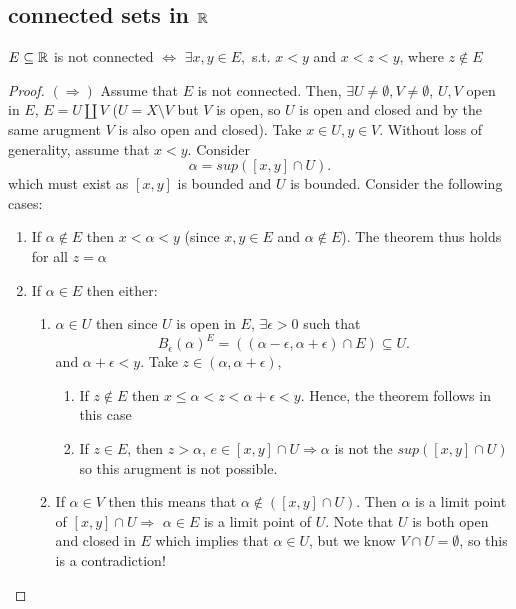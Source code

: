 \documentclass[a4paper]{article}
\begin{document}
\subsection{connected sets in $\mathbb{R}$}
\begin{theorem}
  $E \subseteq \mathbb{R}$ is not connected $\iff$ $\exists x,y \in E,$ s.t. $ x < y$ and $x < z < y$, where  $z \not\in E$ 
  \begin{proof}
    $\left( \Rightarrow \right) $ Assume that $E$ is not connected. Then, $\exists U \neq \emptyset, V \neq \emptyset$, $U,V$ open in $E$,  $E = U \amalg V $ ($U = X \setminus V$ but $V$ is open, so $U$ is open and closed and by the same arugment  $V$ is also open and closed). Take $x \in U, y \in V$. Without loss of generality, assume that  $x < y$. Consider
     \[
       \alpha = sup\left( [x,y] \cap U \right) 
     .\]
     which must exist as $[x,y]$ is bounded and  $U$ is bounded. Consider the following cases:
      \begin{enumerate}
       \item If $\alpha \not\in E$ then  $x < \alpha < y$ (since  $x,y \in E$ and  $\alpha \not\in E$). The theorem thus holds for all $z = \alpha$
       \item   If $\alpha \in E$ then either:
         \begin{enumerate}
           \item $\alpha \in U$ then since $U$ is open in  $E$,  $\exists  \epsilon > 0$ such that \[
           B_\epsilon (\alpha)^{E} = (\left( \alpha - \epsilon, \alpha + \epsilon \right) \cap E) \subseteq U
           .\] and $\alpha + \epsilon < y$. Take $z \in \left( \alpha, \alpha + \epsilon \right) $,
           \begin{enumerate}
             \item If $z \not\in E$ then $x \leq \alpha < z < \alpha + \epsilon < y$. Hence, the theorem follows in this case
             \item   If $z \in E$, then  $z > \alpha$,  $e \in [x,y] \cap U \Rightarrow \alpha$ is not the $sup([x,y] \cap U)$  so this arugment is not possible. 
           \end{enumerate}
         \item If $\alpha \in V$ then this means that $\alpha \not\in ([x,y] \cap U)$. Then $\alpha$ is a limit point of  $[x,y] \cap U \Rightarrow$ $\alpha \in E$ is a limit point of $U$. Note that  $U$ is both open and closed in  $E$ which implies that $\alpha \in U$, but we know  $V \cap U = \emptyset$, so this is a contradiction!
         \end{enumerate}
     \end{enumerate}
  \end{proof}
\end{theorem}
\end{document}

